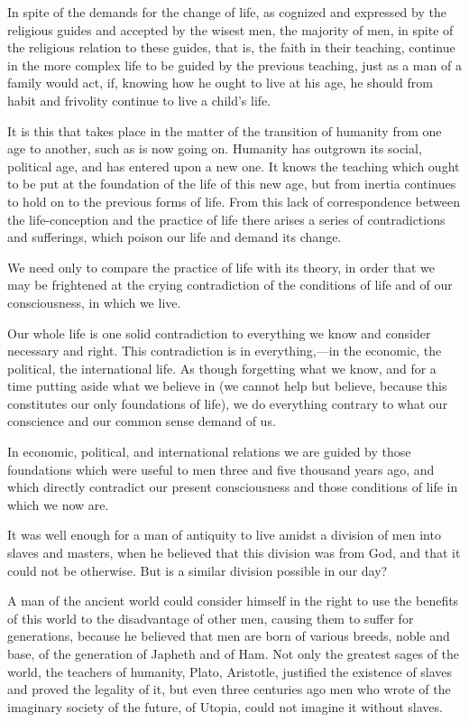 \documentclass{book}
\begin{document}
In spite of the demands for the change of life, as cognized and expressed by the religious guides and accepted by the wisest men, the majority of men, in spite of the religious relation to these guides, that is, the faith in their teaching, continue in the more complex life to be guided by the previous teaching, just as a man of a family would act, if, knowing how he ought to live at his age, he should from habit and frivolity continue to live a child’s life.

It is this that takes place in the matter of the transition of humanity from one age to another, such as is now going on. Humanity has outgrown its social, political age, and has entered upon a new one. It knows the teaching which ought to be put at the foundation of the life of this new age, but from inertia continues to hold on to the previous forms of life. From this lack of correspondence between the life-conception and the practice of life there arises a series of contradictions and sufferings, which poison our life and demand its change.

We need only to compare the practice of life with its theory, in order that we may be frightened at the crying contradiction of the conditions of life and of our consciousness, in which we live.

Our whole life is one solid contradiction to everything we know and consider necessary and right. This contradiction is in everything,—in the economic, the political, the international life. As though forgetting what we know, and for a time putting aside what we believe in (we cannot help but believe, because this constitutes our only foundations of life), we do everything contrary to what our conscience and our common sense demand of us.

In economic, political, and international relations we are guided by those foundations which were useful to men three and five thousand years ago, and which directly contradict our present consciousness and those conditions of life in which we now are.

It was well enough for a man of antiquity to live amidst a division of men into slaves and masters, when he believed that this division was from God, and that it could not be otherwise. But is a similar division possible in our day?

A man of the ancient world could consider himself in the right to use the benefits of this world to the disadvantage of other men, causing them to suffer for generations, because he believed that men are born of various breeds, noble and base, of the generation of Japheth and of Ham. Not only the greatest sages of the world, the teachers of humanity, Plato, Aristotle, justified the existence of slaves and proved the legality of it, but even three centuries ago men who wrote of the imaginary society of the future, of Utopia, could not imagine it without slaves.
\end{document}
